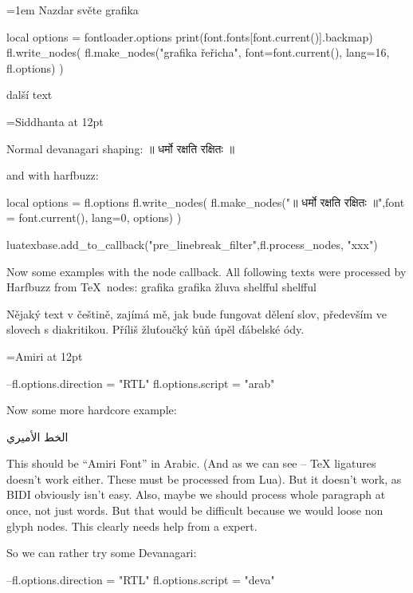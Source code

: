 \documentclass{article}
\begin{document}
\parindent=0pt
\parskip=1em
\ahoj Nazdar světe grafika
\begin{luacode*}
  local options = fontloader.options
  print(font.fonts[font.current()].backmap)
  fl.write_nodes(
    fl.make_nodes("grafika řeřicha", {font=font.current(), lang=16}, fl.options)
  )
\end{luacode*}

další text

\frenchspacing %

\font\siddhanta={Siddhanta} at 12pt
\bigskip

\siddhanta 

Normal devanagari shaping: ॥ धर्मो रक्षति रक्षितः ॥

and with harfbuzz: 
\begin{luacode*}
  local options = fl.options
fl.write_nodes(
  fl.make_nodes("॥ धर्मो रक्षति रक्षितः ॥",{font = font.current(), lang=0}, options)
 )
\end{luacode*}

\ahoj

\begin{luacode*}
luatexbase.add_to_callback("pre_linebreak_filter",fl.process_nodes, "xxx")
\end{luacode*}

Now some examples with the node callback. All following texts were processed by
Harfbuzz from TeX\ nodes: grafika graf\/ika žluva shelfful shelf\/ful


Nějaký text v češtině, zajímá mě, jak bude fungovat dělení slov, především ve
slovech s diakritikou. Příliš žluťoučký kůň úpěl ďábelské ódy. 


\font\amiri={Amiri} at 12pt
\amiri
\begin{luacode*}
--fl.options.direction = "RTL"
fl.options.script = "arab"
\end{luacode*}
Now some more hardcore example:


الخط الأميري

This should be ``Amiri Font'' in Arabic. (And as we can see -- TeX ligatures
doesn't work either. These must be processed from Lua). But it doesn't work, as
BIDI obviously isn't easy. Also, maybe we should process whole paragraph at
once, not just words. But that would be difficult because we would loose non
glyph nodes. This clearly needs help from a expert.

So we can rather try some Devanagari:

\begin{luacode*}
--fl.options.direction = "RTL"
fl.options.script = "deva"
\end{luacode*}
\siddhanta
\end{document}
